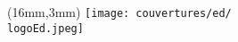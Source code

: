 
% 
% 
\cleardoublepage

\checkoddpage
\ifoddpage
  \null\newpage
  \thispagestyle{empty}

  \else 
\fi



\pagestyle{empty}

\begin{textblock*}{61mm}(16mm,3mm)
	\noindent\texttt{[image: couvertures/ed/\\logoEd.jpeg]}
\end{textblock*}
\topskip=0pt  %

\vspace*{0em}


